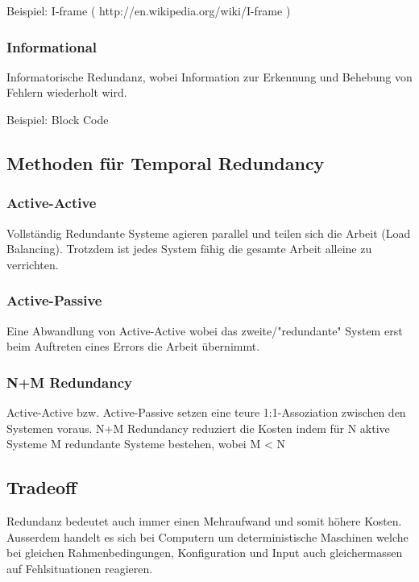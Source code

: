 Beispiel: I-frame ( http://en.wikipedia.org/wiki/I-frame )

\subsubsection*{Informational}

Informatorische Redundanz, wobei Information zur Erkennung und Behebung von Fehlern wiederholt wird.

Beispiel: Block Code

\subsection{Methoden für Temporal Redundancy}


\subsubsection*{Active-Active}

Vollständig Redundante Systeme agieren parallel und teilen sich die Arbeit (Load Balancing). Trotzdem ist jedes System fähig die gesamte Arbeit alleine zu verrichten.

\subsubsection*{Active-Passive}

Eine Abwandlung von Active-Active wobei das zweite/"redundante" System erst beim Auftreten eines Errors die Arbeit übernimmt.

\subsubsection*{N+M Redundancy}

Active-Active bzw. Active-Passive setzen eine teure 1:1-Assoziation zwischen den Systemen voraus. N+M Redundancy reduziert die Kosten indem für N aktive Systeme M redundante Systeme bestehen, wobei M < N

\subsection{Tradeoff}


Redundanz bedeutet auch immer einen Mehraufwand und somit höhere Kosten. Ausserdem handelt es sich bei Computern um deterministische Maschinen welche bei gleichen Rahmenbedingungen, Konfiguration und Input auch gleichermassen auf Fehlsituationen reagieren.

